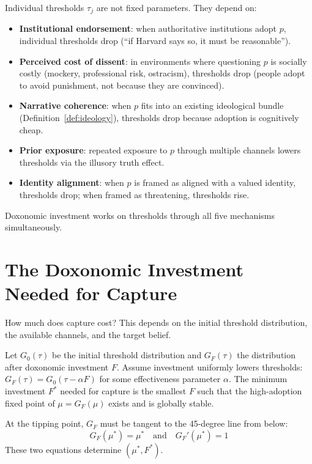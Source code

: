 \begin{remark}
\label{rem:thresholds}
Individual thresholds $\tau_j$ are not fixed parameters.
They depend on:
\begin{itemize}[nosep]
  \item \textbf{Institutional endorsement}: when authoritative institutions adopt $p$, individual thresholds drop (``if Harvard says so, it must be reasonable'').
  \item \textbf{Perceived cost of dissent}: in environments where questioning $p$ is socially costly (mockery, professional risk, ostracism), thresholds drop (people adopt to avoid punishment, not because they are convinced).
  \item \textbf{Narrative coherence}: when $p$ fits into an existing ideological bundle (Definition~\ref{def:ideology}), thresholds drop because adoption is cognitively cheap.
  \item \textbf{Prior exposure}: repeated exposure to $p$ through multiple channels lowers thresholds via the illusory truth effect.
  \item \textbf{Identity alignment}: when $p$ is framed as aligned with a valued identity, thresholds drop; when framed as threatening, thresholds rise.
\end{itemize}
Doxonomic investment works on thresholds through all five mechanisms simultaneously.
\end{remark}


\section{The Doxonomic Investment Needed for Capture}
\label{sec:ch8-investment}

How much does capture cost?
This depends on the initial threshold distribution, the available channels, and the target belief.

\begin{model}
\label{mod:capture-cost}
Let $G_0(\tau)$ be the initial threshold distribution and $G_F(\tau)$ the distribution after doxonomic investment $F$.
Assume investment uniformly lowers thresholds: $G_F(\tau) = G_0(\tau - \alpha F)$ for some effectiveness parameter $\alpha$.
The minimum investment $F^*$ needed for capture is the smallest $F$ such that the high-adoption fixed point of $\mu = G_F(\mu)$ exists and is globally stable.

At the tipping point, $G_F$ must be tangent to the 45-degree line from below:
\[
  G_F(\mu^*) = \mu^* \quad \text{and} \quad G_F'(\mu^*) = 1
\]
These two equations determine $(\mu^*, F^*)$.
\end{model}

